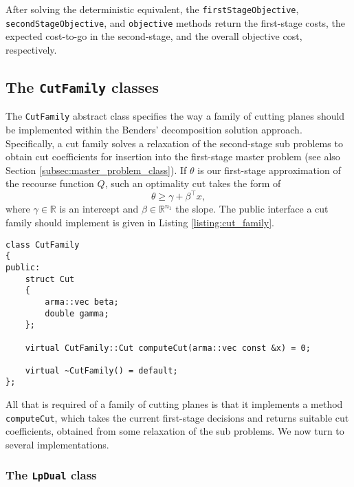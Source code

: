 \documentclass[12pt, english]{article}
\begin{document}
After solving the deterministic equivalent, the \texttt{firstStageObjective}, \texttt{secondStageObjective}, and \texttt{objective} methods return the first-stage costs, the expected cost-to-go in the second-stage, and the overall objective cost, respectively.

\subsection{The \texttt{CutFamily} classes}
\label{subsec:cut_families}

The \texttt{CutFamily} abstract class specifies the way a family of cutting planes should be implemented within the Benders' decomposition solution approach. Specifically, a cut family solves a relaxation of the second-stage sub problems to obtain cut coefficients for insertion into the first-stage master problem (see also Section \ref{subsec:master_problem_class}). If $\theta$ is our first-stage approximation of the recourse function $Q$, such an optimality cut takes the form of
\[ \theta \ge \gamma + \beta^\top x, \]
where $\gamma \in \mathbb{R}$ is an intercept and $\beta \in \mathbb{R}^{n_1}$ the slope. The public interface a cut family should implement is given in Listing \ref{listing:cut_family}.
\begin{lstlisting}[caption={Public interface of the \texttt{CutFamily} class.}, 
                   label={listing:cut_family}]
class CutFamily
{
public:
	struct Cut
	{
		arma::vec beta;
		double gamma;
	};
	
	virtual CutFamily::Cut computeCut(arma::vec const &x) = 0;
		
	virtual ~CutFamily() = default;
};
\end{lstlisting}
All that is required of a family of cutting planes is that it implements a method \texttt{computeCut}, which takes the current first-stage decisions and returns suitable cut coefficients, obtained from some relaxation of the sub problems. We now turn to several implementations.

\subsubsection{The \texttt{LpDual} class}
\label{subsubsec:lpdual}
\end{document}
